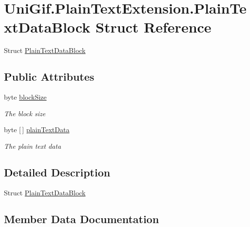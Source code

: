 \hypertarget{struct_uni_gif_1_1_plain_text_extension_1_1_plain_text_data_block}{}\section{Uni\+Gif.\+Plain\+Text\+Extension.\+Plain\+Text\+Data\+Block Struct Reference}
\label{struct_uni_gif_1_1_plain_text_extension_1_1_plain_text_data_block}


Struct \hyperlink{struct_uni_gif_1_1_plain_text_extension_1_1_plain_text_data_block}{Plain\+Text\+Data\+Block}  


\subsection*{Public Attributes}
\begin{DoxyCompactItemize}
\item 
byte \hyperlink{struct_uni_gif_1_1_plain_text_extension_1_1_plain_text_data_block_afd6d9ba7ad4ff5d060e5431203b5493b}{block\+Size}
\begin{DoxyCompactList}\small\item\em The block size \end{DoxyCompactList}\item 
byte \mbox{[}$\,$\mbox{]} \hyperlink{struct_uni_gif_1_1_plain_text_extension_1_1_plain_text_data_block_ac21ffc57510bdeb700b8350fffe230ca}{plain\+Text\+Data}
\begin{DoxyCompactList}\small\item\em The plain text data \end{DoxyCompactList}\end{DoxyCompactItemize}


\subsection{Detailed Description}
Struct \hyperlink{struct_uni_gif_1_1_plain_text_extension_1_1_plain_text_data_block}{Plain\+Text\+Data\+Block} 



\subsection{Member Data Documentation}
\mbox{\label{struct_uni_gif_1_1_plain_text_extension_1_1_plain_text_data_block_afd6d9ba7ad4ff5d060e5431203b5493b}} 
